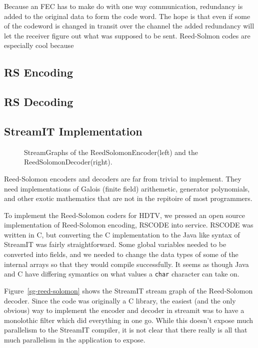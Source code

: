 Because an FEC has to make do with one way communication, redundancy is added to the original data to form the
code word. The hope is that even if some of the codeword is changed in transit over the channel the
added redundancy will let the receiver figure out what was supposed to be sent. Reed-Solmon codes are
especially cool because 

\subsection{RS Encoding}

\subsection{RS Decoding}



\subsection{StreamIT Implementation}
\begin{figure}
\center
\epsfxsize=2.5in
\epsfxsize=2.5in
\caption{StreamGraphs of the ReedSolomonEncoder(left) and the ReedSolomonDecoder(right).}
\label{fig:sg-reed-solomon}
\end{figure}

Reed-Solomon encoders and decoders are far from trivial to implement. 
They need implementations of Galois (finite field) arithemetic, generator polynomials, 
and other exotic mathematics that are not in the repitoire of most programmers.

To implement the Reed-Solomon coders for HDTV, we pressed an open
source implementation of Reed-Solomon encoding, RSCODE\cite{rscode}
 into service. RSCODE was written in C, but converting the C implementation
to the Java like syntax of StreamIT was fairly straightforward. Some global variables 
needed to be converted into fields, and we needed to change the data types of some 
of the internal arrays so that they would compile successfully. It seems as though
Java and C have differing symantics on what values a \texttt{char} character
can take on.

Figure~\ref{sg-reed-solomon} shows the StreamIT stream graph of the Reed-Solomon
decoder. Since the code was originally a C library, the easiest (and the only obvious)
way to implement the encoder and decoder in streamit was to have a monolothic filter
which did everything in one go. While this doesn't expose much parallelism to the
StreamIT compiler, it is not clear that there really is all that much parallelism in the
application to expose. 